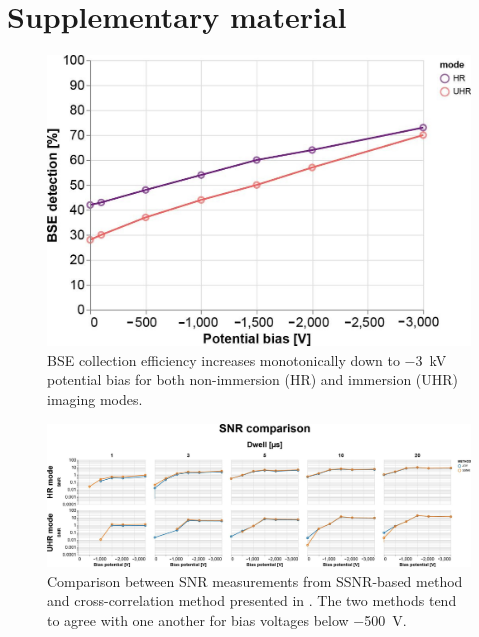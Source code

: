 \clearpage

\renewcommand\thesection{\arabic{chapter}.\Alph{section}}
\setcounter{section}{0}
\section{Supplementary material}
\label{sec:2_supplement}

\renewcommand{\thefigure}{2.A\arabic{figure}}
\setcounter{figure}{0}


\begin{figure}[!tbh]
    \centering
    \includegraphics[width=0.75\linewidth]{chapter-2/figures_JPEG_HQ/fig2-S1_percentages.jpg}
    \caption{BSE collection efficiency increases monotonically down to \SI{-3}{\kilo\volt} potential bias for both non-immersion (HR) and immersion (UHR) imaging modes.}
    \label{fig:2.S1_percentages}
\end{figure}



\begin{figure}[!tbh]
    \centering
    \includegraphics[width=\linewidth]{chapter-2/figures_JPEG_HQ/fig2-S2_comparison.jpg}
    \caption{Comparison between SNR measurements from SSNR-based method and cross-correlation method presented in \textcite{joy2002smart}. The two methods tend to agree with one another for bias voltages below \SI{-500}{\volt}.}
    \label{fig:2.S2_comparison}
\end{figure}

